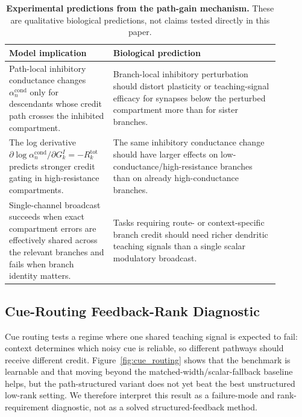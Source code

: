     \begin{table}[t]
    \centering
    \small
    \begin{tabular}{@{}L{0.31\linewidth}L{0.58\linewidth}@{}}
    \toprule
    \textbf{Model implication} & \textbf{Biological prediction} \\
    \midrule
    Path-local inhibitory conductance changes $\alpha_n^{\mathrm{cond}}$ only for descendants whose credit path crosses the inhibited compartment. & Branch-local inhibitory perturbation should distort plasticity or teaching-signal efficacy for synapses below the perturbed compartment more than for sister branches. \\
    The log derivative $\partial\log\alpha_n^{\mathrm{cond}}/\partial G_k^I=-R_k^{\mathrm{tot}}$ predicts stronger credit gating in high-resistance compartments. & The same inhibitory conductance change should have larger effects on low-conductance/high-resistance branches than on already high-conductance branches. \\
    Single-channel broadcast succeeds when exact compartment errors are effectively shared across the relevant branches and fails when branch identity matters. & Tasks requiring route- or context-specific branch credit should need richer dendritic teaching signals than a single scalar modulatory broadcast. \\
    \bottomrule
    \end{tabular}
    \caption{\textbf{Experimental predictions from the path-gain mechanism.} These are qualitative biological predictions, not claims tested directly in this paper.}
    \label{tab:experimental_predictions}
    \end{table}
    
    \subsection{Cue-Routing Feedback-Rank Diagnostic}
    
    Cue routing tests a regime where one shared teaching signal is expected to fail: context determines which noisy cue is reliable, so different pathways should receive different credit. Figure~\ref{fig:cue_routing} shows that the benchmark is learnable and that moving beyond the matched-width/scalar-fallback baseline helps, but the path-structured variant does not yet beat the best unstructured low-rank setting. We therefore interpret this result as a failure-mode and rank-requirement diagnostic, not as a solved structured-feedback method.
    
